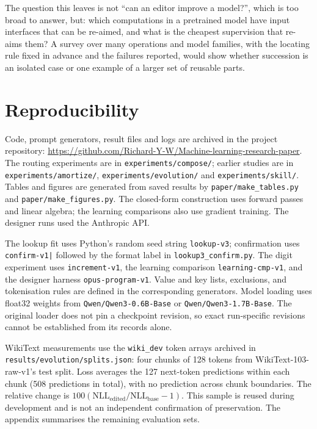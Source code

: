 \documentclass[11pt]{article}
\begin{document}
The question this leaves is not ``can an editor improve a model?'', which is too broad to answer, but: which computations in a pretrained model have input interfaces that can be re-aimed, and what is the cheapest supervision that re-aims them? A survey over many operations and model families, with the locating rule fixed in advance and the failures reported, would show whether succession is an isolated case or one example of a larger set of reusable parts.

\sloppy
\section*{Reproducibility}
\begingroup\raggedright
Code, prompt generators, result files and logs are archived in the project repository: \url{https://github.com/Richard-Y-W/Machine-learning-research-paper}. The routing experiments are in \texttt{experiments/compose/}; earlier studies are in \texttt{experiments/amortize/}, \texttt{experiments/evolution/} and \texttt{experiments/skill/}. Tables and figures are generated from saved results by \texttt{paper/make\_tables.py} and \texttt{paper/make\_figures.py}. The closed-form construction uses forward passes and linear algebra; the learning comparisons also use gradient training. The designer runs used the Anthropic API.

The lookup fit uses Python's random seed string \texttt{lookup-v3}; confirmation uses \texttt{confirm-v1|} followed by the format label in \texttt{lookup3\_confirm.py}. The digit experiment uses \texttt{increment-v1}, the learning comparison \texttt{learning-cmp-v1}, and the designer harness \texttt{opus-program-v1}. Value and key lists, exclusions, and tokenisation rules are defined in the corresponding generators. Model loading uses float32 weights from \texttt{Qwen/Qwen3-0.6B-Base} or \texttt{Qwen/Qwen3-1.7B-Base}. The original loader does not pin a checkpoint revision, so exact run-specific revisions cannot be established from its records alone.

WikiText measurements use the \texttt{wiki\_dev} token arrays archived in \texttt{results/evolution/splits.json}: four chunks of 128 tokens from WikiText-103-raw-v1's test split. Loss averages the 127 next-token predictions within each chunk (508 predictions in total), with no prediction across chunk boundaries. The relative change is $100(\mathrm{NLL}_{\mathrm{edited}}/\mathrm{NLL}_{\mathrm{base}}-1)$. This sample is reused during development and is not an independent confirmation of preservation. The appendix summarises the remaining evaluation sets.
\par\endgroup
\end{document}
